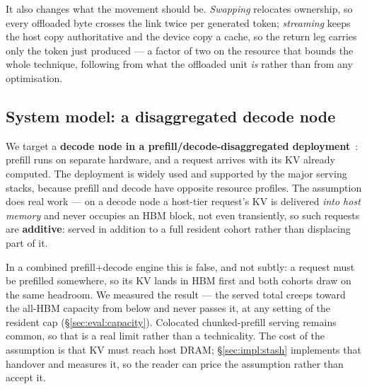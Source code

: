It also changes what the movement should be. \emph{Swapping} relocates ownership,
so every offloaded byte crosses the link twice per generated token;
\emph{streaming} keeps the host copy authoritative and the device copy a cache, so
the return leg carries only the token just produced --- a factor of two on the
resource that bounds the whole technique, following from what the offloaded unit
\emph{is} rather than from any optimisation.

\subsection{System model: a disaggregated decode node}
\label{sec:background:pd}

We target a \textbf{decode node in a prefill/decode-disaggregated
deployment}~\cite{distserve,splitwise,mooncake}: prefill runs on separate hardware,
and a request arrives with its KV already computed. The deployment is widely used
and supported by the major serving stacks, because prefill and decode have opposite
resource profiles. The assumption does real work --- on a decode node a host-tier
request's KV is delivered \emph{into host memory} and never occupies an HBM block,
not even transiently, so such requests are \textbf{additive}: served in addition to
a full resident cohort rather than displacing part of it.

In a combined prefill+decode engine this is false, and not subtly: a request must
be prefilled somewhere, so its KV lands in HBM first and both cohorts draw on the
same headroom. We measured the result --- the served total creeps toward the
all-HBM capacity from below and never passes it, at any setting of the resident
cap (\S\ref{sec:eval:capacity}). Colocated chunked-prefill serving remains common,
so that is a real limit rather than a technicality. The cost of the assumption is
that KV must reach host DRAM; \S\ref{sec:impl:stash} implements that handover and
measures it, so the reader can price the assumption rather than accept it.

